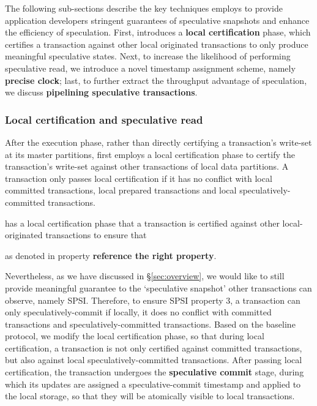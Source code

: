 The following sub-sections describe the key techniques \specula employs to provide application developers stringent guarantees of speculative snapshots and enhance the efficiency of speculation. First, \specula introduces a \textbf{local certification} phase, which certifies a transaction against other local originated transactions to only produce meaningful speculative states. Next, to increase the likelihood of performing speculative read, we introduce a novel timestamp assignment scheme, namely \textbf{precise clock}; last, to further extract the throughput advantage of speculation, we discuss \textbf{pipelining speculative transactions}.

\subsubsection{Local certification and speculative read}
After the execution phase, rather than directly certifying a transaction's write-set at its master partitions, \specula first employs a local certification phase to certify the transaction's write-set against other transactions of local data partitions. A transaction only passes local certification if it has no conflict with local committed transactions, local prepared transactions and local speculatively-committed transactions.



\specula has a local certification phase that a transaction is certified against other local-originated transactions to ensure that

 as denoted in property \textbf{reference the right property}.  

Nevertheless, as we have discussed in \S \ref{sec:overview}, we would like to still provide meaningful guarantee to the `speculative snapshot' other transactions can observe, namely SPSI. Therefore, to ensure SPSI property 3, a transaction can only speculatively-commit if locally, it does no conflict with committed transactions and speculatively-committed transactions. Based on the baseline protocol, we modify the local certification phase, so that during local certification, a transaction is not only certified against committed transactions, but also against local speculatively-committed transactions. After passing local certification, the transaction undergoes the \textbf{speculative commit} stage, during which its updates are assigned a speculative-commit timestamp and applied to the local storage, so that they will be atomically visible to local transactions.

